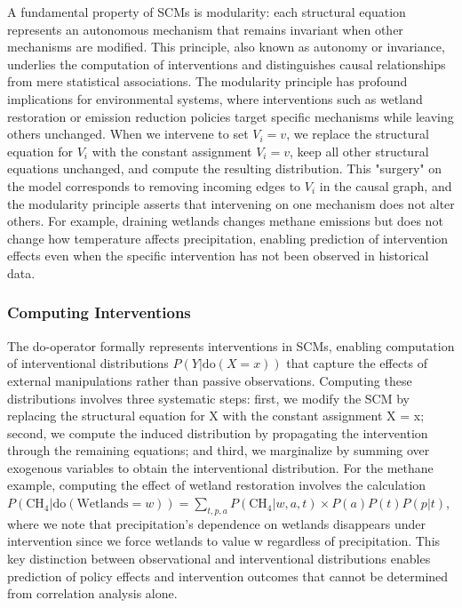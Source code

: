 A fundamental property of SCMs is modularity: each structural equation represents an autonomous mechanism that remains invariant when other mechanisms are modified. This principle, also known as autonomy or invariance, underlies the computation of interventions and distinguishes causal relationships from mere statistical associations. The modularity principle has profound implications for environmental systems, where interventions such as wetland restoration or emission reduction policies target specific mechanisms while leaving others unchanged. When we intervene to set $V_i = v$, we replace the structural equation for $V_i$ with the constant assignment $V_i = v$, keep all other structural equations unchanged, and compute the resulting distribution. This "surgery" on the model corresponds to removing incoming edges to $V_i$ in the causal graph, and the modularity principle asserts that intervening on one mechanism does not alter others. For example, draining wetlands changes methane emissions but does not change how temperature affects precipitation, enabling prediction of intervention effects even when the specific intervention has not been observed in historical data.

\subsubsection{Computing Interventions}

The do-operator formally represents interventions in SCMs, enabling computation of interventional distributions $P(Y|\text{do}(X=x))$ that capture the effects of external manipulations rather than passive observations. Computing these distributions involves three systematic steps: first, we modify the SCM by replacing the structural equation for X with the constant assignment X = x; second, we compute the induced distribution by propagating the intervention through the remaining equations; and third, we marginalize by summing over exogenous variables to obtain the interventional distribution. For the methane example, computing the effect of wetland restoration involves the calculation $P(\text{CH}_4|\text{do}(\text{Wetlands}=w)) = \sum_{t,p,a} P(\text{CH}_4|w,a,t) \times P(a)P(t)P(p|t)$, where we note that precipitation's dependence on wetlands disappears under intervention since we force wetlands to value w regardless of precipitation. This key distinction between observational and interventional distributions enables prediction of policy effects and intervention outcomes that cannot be determined from correlation analysis alone.

